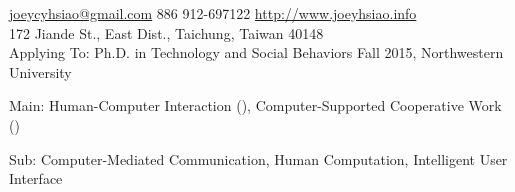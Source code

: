 \documentclass[10pt, a4paper]{article} %
\begin{document}
 



\noindent\href{mailto:joeycyhsiao@gmail.com}{joeycyhsiao@gmail.com}\bull %
\textsmaller{+}886 912-697122\bull %
\href{http://www.joeyhsiao.info}{http://www.joeyhsiao.info}\\ %
172 Jiande St., East Dist., Taichung, Taiwan 40148\\ 
Applying To: Ph.D. in Technology and Social Behaviors Fall 2015, Northwestern University 

\spacedhrule{1.5em}{-1em} %






Main: Human-Computer Interaction (), Computer-Supported Cooperative Work () 

Sub: Computer-Mediated Communication, Human Computation, Intelligent User Interface

\spacedhrule{1.5em}{-1em} %

\end{document}
